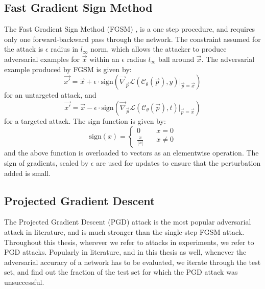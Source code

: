 \documentclass{ociamthesis}
\begin{document}
\subsection{Fast Gradient Sign Method}
The Fast Gradient Sign Method (FGSM) \citep{Goodfellow2015ExplainingAH}, is a
one step procedure, and requires only one forward-backward pass through the
network. The constraint assumed for the attack is $\epsilon$ radius in
$l_\infty$ norm, which allows the attacker to produce adversarial examples for
$\vec{x}$ within an $\epsilon$ radius $l_\infty$ ball around $\vec{x}$. The
adversarial example produced by FGSM is given by:
\begin{equation*}
    \vec{x'}
    = \vec{x} + \epsilon \cdot
    \text{sign}(\vec{\nabla}_\vec{p} \mathcal{L}(\mathcal{C}_\theta (\vec{p}), y)
    \bigr \rvert_{\vec{p}=\vec{x}})
\end{equation*}
for an untargeted attack, and
\begin{equation*}
    \vec{x'}
    = \vec{x} - \epsilon \cdot
    \text{sign}(\vec{\nabla}_\vec{p} \mathcal{L}(\mathcal{C}_\theta (\vec{p}), t)
    \bigr \rvert_{\vec{p}=\vec{x}})
\end{equation*}
for a targeted attack. The sign function is given by:
\begin{equation*}
    \text{sign}(x) = 
    \left\{
        \begin{array}{ll}
            0 & \quad x = 0 \\
            \frac{x}{|x|} & \quad x \neq 0
        \end{array}
    \right.
\end{equation*}
and the above function is overloaded to vectors as an elementwise operation. The
sign of gradients, scaled by $\epsilon$ are used for updates to ensure that the
perturbation added is small.


\subsection{Projected Gradient Descent}
The Projected Gradient Descent (PGD) \citep{madry2019deep} attack is the most
popular adversarial attack in literature, and is much stronger than the
single-step FGSM attack. Throughout this thesis, wherever we refer to attacks in
experiments, we refer to PGD attacks. Popularly in literature, and in this
thesis as well, whenever the adversarial accuracy of a network has to be
evaluated, we iterate through the test set, and find out the fraction of the
test set for which the PGD attack was unsuccessful.
\end{document}
